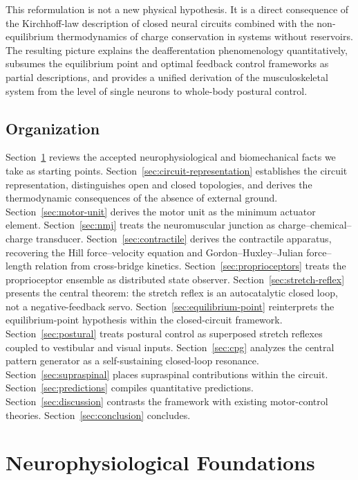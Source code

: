 \documentclass[11pt,twocolumn,a4paper]{article}
\theoremstyle{definition}
\theoremstyle{remark}
\begin{document}
This reformulation is not a new physical hypothesis. It is a direct
consequence of the Kirchhoff-law description of closed neural circuits
combined with the non-equilibrium thermodynamics of charge conservation
in systems without reservoirs. The resulting picture explains the
deafferentation phenomenology quantitatively, subsumes the equilibrium
point and optimal feedback control frameworks as partial descriptions,
and provides a unified derivation of the musculoskeletal system from
the level of single neurons to whole-body postural control.

\subsection{Organization}

Section~\ref{sec:foundations} reviews the accepted neurophysiological
and biomechanical facts we take as starting points.
Section~\ref{sec:circuit-representation} establishes the circuit
representation, distinguishes open and closed topologies, and derives
the thermodynamic consequences of the absence of external ground.
Section~\ref{sec:motor-unit} derives the motor unit as the minimum
actuator element. Section~\ref{sec:nmj} treats the neuromuscular
junction as charge--chemical--charge transducer.
Section~\ref{sec:contractile} derives the contractile apparatus,
recovering the Hill force--velocity equation and Gordon--Huxley--Julian
force--length relation from cross-bridge kinetics.
Section~\ref{sec:proprioceptors} treats the proprioceptor ensemble as
distributed state observer. Section~\ref{sec:stretch-reflex} presents
the central theorem: the stretch reflex is an autocatalytic closed
loop, not a negative-feedback servo.
Section~\ref{sec:equilibrium-point} reinterprets the
equilibrium-point hypothesis within the closed-circuit framework.
Section~\ref{sec:postural} treats postural control as superposed
stretch reflexes coupled to vestibular and visual inputs.
Section~\ref{sec:cpg} analyzes the central pattern generator as a
self-sustaining closed-loop resonance.
Section~\ref{sec:supraspinal} places supraspinal contributions within
the circuit. Section~\ref{sec:predictions} compiles quantitative
predictions. Section~\ref{sec:discussion} contrasts the framework with
existing motor-control theories. Section~\ref{sec:conclusion}
concludes.


\section{Neurophysiological Foundations}
\label{sec:foundations}
\end{document}

